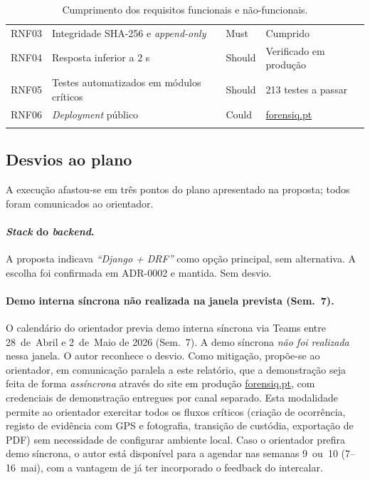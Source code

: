 \begin{longtable}{@{}cL{8.5cm}L{2.0cm}L{2.5cm}@{}}
RNF03 & Integridade SHA-256 e \emph{append-only}           & Must  & Cumprido \\
RNF04 & Resposta inferior a 2 s                           & Should & Verificado em produção \\
RNF05 & Testes automatizados em módulos críticos           & Should & 213 testes a passar \\
RNF06 & \emph{Deployment} público                         & Could & \href{https://forensiq.pt}{forensiq.pt} \\
\bottomrule
\caption{Cumprimento dos requisitos funcionais e não-funcionais.}
\label{tab:acceptance}
\end{longtable}

\subsection{Desvios ao plano}
\label{sec:deviations}

A execução afastou-se em três pontos do plano apresentado na
proposta; todos foram comunicados ao orientador.

\paragraph{\emph{Stack} do \emph{backend}.}
A proposta indicava \emph{``Django + DRF''} como opção principal,
sem alternativa. A escolha foi confirmada em ADR-0002 e mantida.
Sem desvio.

\paragraph{Demo interna síncrona não realizada na janela prevista
(Sem.~7).}
O calendário do orientador previa demo interna síncrona via Teams
entre 28~de~Abril e 2~de~Maio de 2026 (Sem.~7). A demo síncrona
\emph{não foi realizada} nessa janela. O autor reconhece o desvio.
Como mitigação, propõe-se ao orientador, em comunicação paralela a
este relatório, que a demonstração seja feita de forma \emph{assíncrona}
através do site em produção \href{https://forensiq.pt}{forensiq.pt},
com credenciais de demonstração entregues por canal separado. Esta
modalidade permite ao orientador exercitar todos os fluxos críticos
(criação de ocorrência, registo de evidência com GPS e fotografia,
transição de custódia, exportação de PDF) sem necessidade de
configurar ambiente local. Caso o orientador prefira demo síncrona,
o autor está disponível para a agendar nas semanas 9~ou~10
(7--16~mai), com a vantagem de já ter incorporado o feedback do
intercalar.

